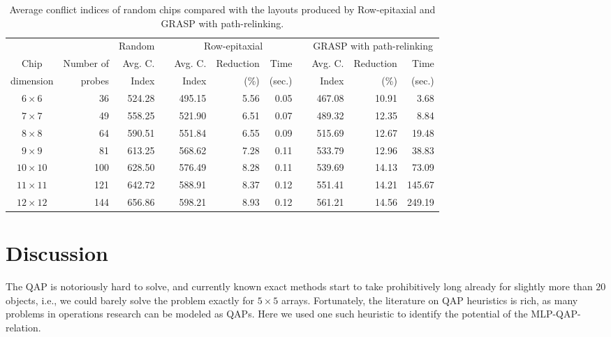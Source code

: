 \begin{table}[t]
\caption{\label{tab:graspr_reptx_ci}
  Average conflict indices of random chips compared with the layouts produced by
  Row-epitaxial and GRASP with path-relinking.}
\scriptsize{
\begin{tabular}{crrcrrrcrrr}
          &            & Random & & \multicolumn{3}{c}{Row-epitaxial}  & & \multicolumn{3}{c}{GRASP with path-relinking}  \\ \cline{3-3} \cline{5-7} \cline{9-11}
Chip      & Number of  & Avg. C.& & Avg. C.& Reduction & Time          & & Avg. C.& Reduction & Time   \\
dimension & probes     & Index  & & Index  & (\%)      & (sec.)        & & Index  & (\%)      & (sec.) \\
\hline
$6\times 6$   &  36 & 524.28 & & 495.15 & 5.56 & 0.05 & & 467.08 & 10.91 &   3.68 \\
$7\times 7$   &  49 & 558.25 & & 521.90 & 6.51 & 0.07 & & 489.32 & 12.35 &   8.84 \\
$8\times 8$   &  64 & 590.51 & & 551.84 & 6.55 & 0.09 & & 515.69 & 12.67 &  19.48 \\
$9\times 9$   &  81 & 613.25 & & 568.62 & 7.28 & 0.11 & & 533.79 & 12.96 &  38.83 \\
$10\times 10$ & 100 & 628.50 & & 576.49 & 8.28 & 0.11 & & 539.69 & 14.13 &  73.09 \\
$11\times 11$ & 121 & 642.72 & & 588.91 & 8.37 & 0.12 & & 551.41 & 14.21 & 145.67 \\
$12\times 12$ & 144 & 656.86 & & 598.21 & 8.93 & 0.12 & & 561.21 & 14.56 & 249.19 \\
\hline
\end{tabular}}
\end{table}

\section{Discussion}
\label{sec:qap_discussion}

The QAP is notoriously hard to solve, and currently known exact methods start to
take prohibitively long already for slightly more than $20$ objects, i.e., we
could barely solve the problem exactly for $5\times 5$ arrays. Fortunately, the
literature on QAP heuristics is rich, as many problems in operations research
can be modeled as QAPs. Here we used one such heuristic to identify the
potential of the MLP-QAP-relation.


